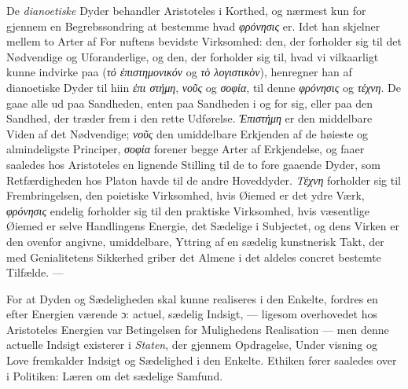 \documentclass[12pt,a4paper]{book}
\newcommand{\gk}[1]{\textit{#1}}
\begin{document}
De \emph{dianoetiske} Dyder behandler Aristoteles i Korthed,
og nærmest kun for gjennem en Begrebssondring at bestemme
hvad \gk{φρόνησις} er. Idet han skjelner mellem to Arter af For\-%
nuftens bevidste Virksomhed: den, der forholder sig til det
Nødvendige og Uforanderlige, og den, der forholder sig til,
hvad vi vilkaarligt kunne indvirke paa (\gk{τό ἐπιστημονικόν} og
\gk{τὸ λογιστικὸν}), henregner han af dianoetiske Dyder til hiin \gk{ἐπι\-%
στήμη}, \gk{νοῦς} og \gk{σοφία}, til denne \gk{φρόνησις} og \gk{τέχνη}. De gaae
alle ud paa Sandheden, enten paa Sandheden i og for sig,
eller paa den Sandhed, der træder frem i den rette Udførelse.
\gk{Ἐπιστήμη} er den middelbare Viden af det Nødvendige; \gk{νοῦς}
den umiddelbare Erkjenden af de høieste og almindeligste
Principer, \gk{σοφία} forener begge Arter af Erkjendelse, og faaer
saaledes hos Aristoteles en lignende Stilling til de to fore\-%
gaaende Dyder, som Retfærdigheden hos Platon havde til de
andre Hoveddyder. \gk{Τέχνη} forholder sig til Frembringelsen,
den poietiske Virksomhed, hvis Øiemed er det ydre Værk,
\gk{φρόνησις} endelig forholder sig til den praktiske Virksomhed,
hvis væsentlige Øiemed er selve Handlingens Energie, det
Sædelige i Subjectet, og dens Virken er den ovenfor angivne,
umiddelbare, Yttring af en sædelig kunstnerisk Takt, der med
Genialitetens Sikkerhed griber det Almene i det aldeles concret
bestemte Tilfælde. ---

For at Dyden og Sædeligheden skal kunne realiseres i den
Enkelte, fordres en efter Energien værende ɔ: actuel, sædelig
Indsigt, --- ligesom overhovedet hos Aristoteles Energien var
Betingelsen for Mulighedens Realisation --- men denne actuelle
Indsigt existerer i \emph{Staten}, der gjennem Opdragelse, Under\-%
visning og Love fremkalder Indsigt og Sædelighed i den
Enkelte. Ethiken fører saaledes over i Politiken: Læren om
det sædelige Samfund.
\end{document}
